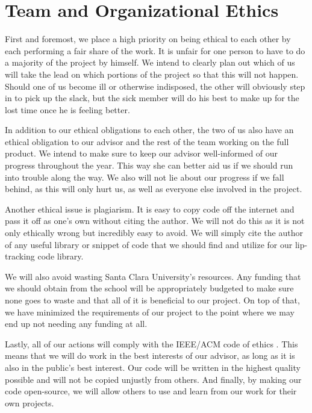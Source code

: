 \section{Team and Organizational Ethics}
First and foremost, we place a high priority on being ethical to each other by each performing a fair share of the work. It is unfair for one person to have to do a majority of the project by himself. We intend to clearly plan out which of us will take the lead on which portions of the project so that this will not happen. Should one of us become ill or otherwise indisposed, the other will obviously step in to pick up the slack, but the sick member will do his best to make up for the lost time once he is feeling better.

In addition to our ethical obligations to each other, the two of us also have an ethical obligation to our advisor and the rest of the team working on the full product. We intend to make sure to keep our advisor well-informed of our progress throughout the year. This way she can better aid us if we should run into trouble along the way. We also will not lie about our progress if we fall behind, as this will only hurt us, as well as everyone else involved in the project.

Another ethical issue is plagiarism. It is easy to copy code off the internet and pass it off as one's own without citing the author. We will not do this as it is not only ethically wrong but incredibly easy to avoid. We will simply cite the author of any useful library or snippet of code that we should find and utilize for our lip-tracking code library.

We will also avoid wasting Santa Clara University's resources. Any funding that we should obtain from the school will be appropriately budgeted to make sure none goes to waste and that all of it is beneficial to our project. On top of that, we have minimized the requirements of our project to the point where we may end up not needing any funding at all.

Lastly, all of our actions will comply with the IEEE/ACM code of ethics \cite{acm-ethics}. This means that we will do work in the best interests of our advisor, as long as it is also in the public's best interest. Our code will be written in the highest quality possible and will not be copied unjustly from others. And finally, by making our code open-source, we will allow others to use and learn from our work for their own projects. 


